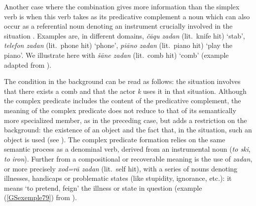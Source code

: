 Another case where the combination gives more information than the simplex verb is when this verb
takes as its predicative complement a noun which can also occur as a referential noun denoting an
instrument crucially involved in the situation \citep{bonami2010persian}. Examples are, in different
domains, \emph{\v c\=aqu zadan} (lit.\ knife hit) `stab', \emph{telefon zadan} (lit.\ phone hit)
`phone', \emph{pi\=ano zadan} (lit.\ piano hit) `play the piano'. We illustrate here with \emph{\v
  s\=ane zadan} (lit.\ comb hit) `comb' (example adapted from \citealt{bonami2010persian}).    

\z

\ea
\label{GSexemple78}
\z

The condition in the background can be read as follows: the situation  involves that there
exists a comb and that the actor \emph{k} uses it in that situation. Although the complex predicate
includes the content of the predicative complement, the meaning of the complex predicate does not
reduce to that of its semantically more specialized member, as in the preceding case, but adds a
restriction on the background: the existence of an object and the fact that, in the situation, such
an object is used (see \citealt[10]{bonami2010persian}). The complex predicate formation relies on the same semantic
  process as a denominal verb, derived from an instrumental noun (\emph{to ski}, \emph{to iron}).
Further from a compositional or recoverable meaning is the use of \emph{zadan}, or more precisely
\emph{xod=r\=a zadan} (lit.\ self hit), with a series of nouns denoting illnesses, handicaps or
problematic states (like stupidity, ignorance, etc.): it means `to pretend, feign' the illness or
state in question (example (\ref{GSexemple79}) from \citealt[223]{pollet2012grammaire}).

